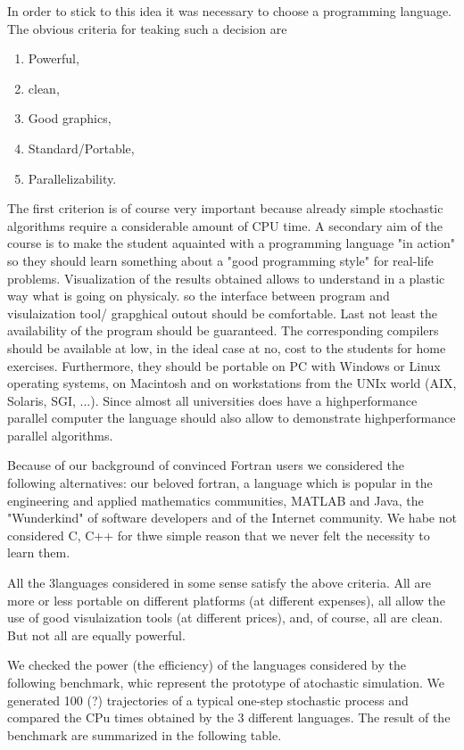 In order to stick to this idea it was necessary to choose a programming 
language. The obvious criteria for teaking such a decision are
\cite[]{GARCIA}
\begin{enumerate}
\item Powerful,
\item clean,
\item Good graphics,
\item Standard/Portable,
\item Parallelizability.
\end{enumerate}
The first criterion is of course very important because already simple 
stochastic algorithms require a considerable amount of CPU time.
A secondary aim of the course is to make the student aquainted with a 
programming language "in action" so they should learn something about a "good 
programming style" for real-life problems. Visualization of the results 
obtained allows to understand in a plastic way what is going on physicaly. so 
the interface between program and visulaization tool/ grapghical outout should
be comfortable. Last not least the availability of the program should be
guaranteed. The corresponding compilers should be available at low, in the 
ideal case at no, cost to the students for home exercises. Furthermore, they
should be portable on PC with Windows or Linux operating systems, on Macintosh
and on workstations from the UNIx world (AIX, Solaris, SGI, ...).
Since almost all universities does have a highperformance parallel computer 
the language should also allow to demonstrate highperformance parallel 
algorithms.

Because of our background of convinced Fortran users we considered the 
following alternatives: our beloved fortran, a language which is popular in 
the engineering and applied mathematics communities, MATLAB and Java, the 
"Wunderkind" of software developers and of the Internet community. We habe 
not considered C, C++ for thwe simple reason that we never felt the necessity 
to learn them.

All the 3languages considered  in some sense satisfy the above criteria. All
are more  or less portable on different platforms (at different expenses), all
allow the use of good visulaization tools (at different prices), and, of 
course, all are clean. But not all are equally powerful. 

We checked the power (the efficiency) of the languages considered by the 
following benchmark, whic represent the prototype of atochastic simulation. 
We generated 100 (?) trajectories of a typical one-step stochastic process
and compared the CPu times obtained by the 3 different languages. The result
of the benchmark are summarized in the following table.

